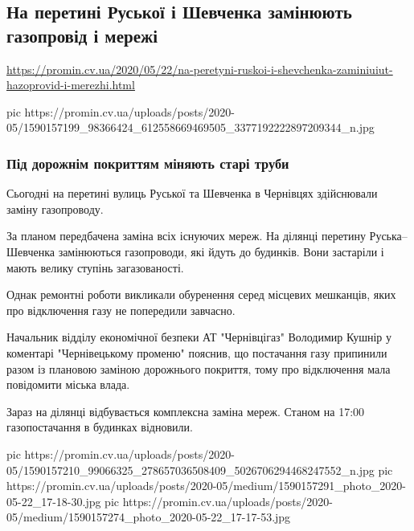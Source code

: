  
 

\subsection{На перетині Руської і Шевченка замінюють газопровід і мережі}
\label{sec:22_05_2020.news.ua.promin_cv_ua.1}

\url{https://promin.cv.ua/2020/05/22/na-peretyni-ruskoi-i-shevchenka-zaminiuiut-hazoprovid-i-merezhi.html}

\ifcmt
pic https://promin.cv.ua/uploads/posts/2020-05/1590157199_98366424_612558669469505_3377192222897209344_n.jpg
\fi

\subsubsection{Під дорожнім покриттям міняють старі труби}

Сьогодні на перетині вулиць Руської та Шевченка в Чернівцях здійснювали заміну
газопроводу.
 
За планом передбачена заміна всіх існуючих мереж. На ділянці перетину
Руська–Шевченка замінюються газопроводи, які йдуть до будинків. Вони застаріли
і мають велику ступінь загазованості.
 
Однак ремонтні роботи викликали обуренення серед місцевих мешканців, яких про
відключення газу не попередили завчасно.
 
Начальник відділу економічної безпеки АТ "Чернівцігаз" Володимир Кушнір у
коментарі "Чернівецькому променю" пояснив, що постачання газу припинили разом
із плановою заміною дорожнього покриття, тому про відключення мала повідомити
міська влада.
 
Зараз на ділянці відбувається комплексна заміна мереж. Станом на 17:00
газопостачання в будинках відновили.

\ifcmt
pic https://promin.cv.ua/uploads/posts/2020-05/1590157210_99066325_278657036508409_5026706294468247552_n.jpg
pic https://promin.cv.ua/uploads/posts/2020-05/medium/1590157291_photo_2020-05-22_17-18-30.jpg
pic https://promin.cv.ua/uploads/posts/2020-05/medium/1590157274_photo_2020-05-22_17-17-53.jpg
\fi
